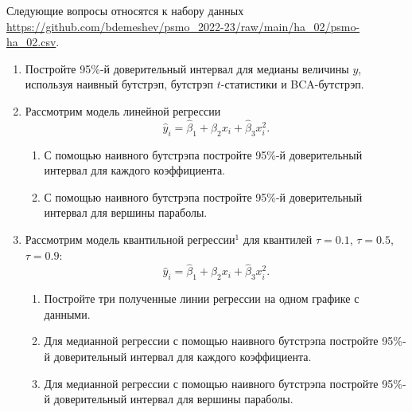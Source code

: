 \documentclass[12pt]{article}
\begin{document}
Следующие вопросы относятся к набору данных \url{https://github.com/bdemeshev/psmo_2022-23/raw/main/ha_02/psmo-ha_02.csv}. 

\begin{enumerate}[resume]
    \item Постройте 95\%-й доверительный интервал для медианы величины $y$, используя наивный бутстрэп, бутстрэп $t$-статистики и BCA-бутстрэп. 

    \item Рассмотрим модель линейной регрессии 
    \[
    \hat y_i = \hat \beta_1 + \hat\beta_2 x_i + \hat\beta_3 x_i^2.
    \]
    \begin{enumerate}
    \item С помощью наивного бутстрэпа постройте 95\%-й доверительный интервал для каждого коэффициента.
    \item С помощью наивного бутстрэпа постройте 95\%-й доверительный интервал для вершины параболы. 
    \end{enumerate}
\item Рассмотрим модель квантильной регрессии$^1$ для квантилей $\tau=0.1$, $\tau=0.5$, $\tau=0.9$:
    \[
    \hat y_i = \hat \beta_1 + \hat\beta_2 x_i + \hat\beta_3 x_i^2.
    \]
    \begin{enumerate}
    \item Постройте три полученные линии регрессии на одном графике с данными. 
    \item Для медианной регрессии с помощью наивного бутстрэпа постройте 95\%-й доверительный интервал для каждого коэффициента.
    \item Для медианной регрессии с помощью наивного бутстрэпа постройте 95\%-й доверительный интервал для вершины параболы. 
    \end{enumerate}


\end{enumerate}
\end{document}
